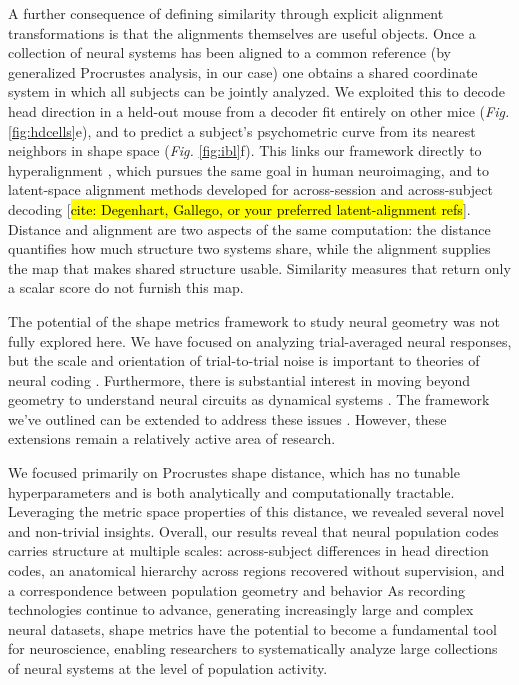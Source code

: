 A further consequence of defining similarity through explicit alignment transformations is that the alignments themselves are useful objects. Once a collection of neural systems has been aligned to a common reference (by generalized Procrustes analysis, in our case) one obtains a shared coordinate system in which all subjects can be jointly analyzed. We exploited this to decode head direction in a held-out mouse from a decoder fit entirely on other mice (\textit{Fig.} \ref{fig:hdcells}e), and to predict a subject's psychometric curve from its nearest neighbors in shape space (\textit{Fig.} \ref{fig:ibl}f). This links our framework directly to hyperalignment \parencite{haxby2020hyperalignment}, which pursues the same goal in human neuroimaging, and to latent-space alignment methods developed for across-session and across-subject decoding [\hl{cite: Degenhart, Gallego, or your preferred latent-alignment refs}]. Distance and alignment are two aspects of the same computation: the distance quantifies how much structure two systems share, while the alignment supplies the map that makes shared structure usable. Similarity measures that return only a scalar score do not furnish this map.

The potential of the shape metrics framework to study neural geometry was not fully explored here.
We have focused on analyzing trial-averaged neural responses, but the scale and orientation of trial-to-trial noise is important to theories of neural coding \parencite{moreno2014information}.
Furthermore, there is substantial interest in moving beyond geometry to understand neural circuits as dynamical systems \parencite{vyas2020computation}.
The framework we've outlined can be extended to address these issues \parencite{duong2023representational,ostrow2024beyond,nejatbakhsh2024comparing}.
However, these extensions remain a relatively active area of research.

We focused primarily on Procrustes shape distance, which has no tunable hyperparameters and is both analytically and computationally tractable.
Leveraging the metric space properties of this distance, we revealed several novel and non-trivial insights. Overall, our results reveal that neural population codes carries structure at multiple scales: across-subject differences in head direction codes, an anatomical hierarchy across regions recovered without supervision, and a correspondence between population geometry and behavior
As recording technologies continue to advance, generating increasingly large and complex neural datasets, shape metrics have the potential to become a fundamental tool for neuroscience, enabling researchers to systematically analyze large collections of neural systems at the level of population activity.


